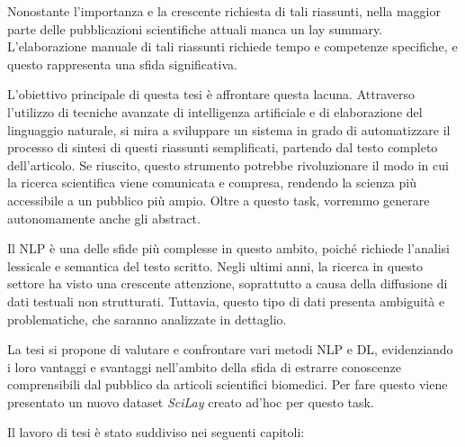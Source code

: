 \documentclass[12pt,a4paper,twoside,openright]{book}
\begin{document}
Nonostante l'importanza e la crescente richiesta di tali riassunti, nella maggior parte delle pubblicazioni scientifiche attuali manca un lay summary. L'elaborazione manuale di tali riassunti richiede tempo e competenze specifiche, e questo rappresenta una sfida significativa.

L'obiettivo principale di questa tesi è affrontare questa lacuna. Attraverso l'utilizzo di tecniche avanzate di intelligenza artificiale e di elaborazione del linguaggio naturale, si mira a sviluppare un sistema in grado di automatizzare il processo di sintesi di questi riassunti semplificati, partendo dal testo completo dell'articolo. Se riuscito, questo strumento potrebbe rivoluzionare il modo in cui la ricerca scientifica viene comunicata e compresa, rendendo la scienza più accessibile a un pubblico più ampio. Oltre a questo task, vorremmo generare autonomamente anche gli abstract.


Il NLP è una delle sfide più complesse in questo ambito, poiché richiede l'analisi lessicale e semantica del testo scritto. Negli ultimi anni, la ricerca in questo settore ha visto una crescente attenzione, soprattutto a causa della diffusione di dati testuali non strutturati. Tuttavia, questo tipo di dati presenta ambiguità e problematiche, che saranno analizzate in dettaglio.


La tesi si propone di valutare e confrontare vari metodi NLP e DL, evidenziando i loro vantaggi e svantaggi nell'ambito della sfida di estrarre conoscenze comprensibili dal pubblico da articoli scientifici biomedici.
Per fare questo viene presentato un nuovo dataset \emph{SciLay} creato ad'hoc per questo task.


Il lavoro di tesi è stato suddiviso nei seguenti capitoli:
\end{document}
